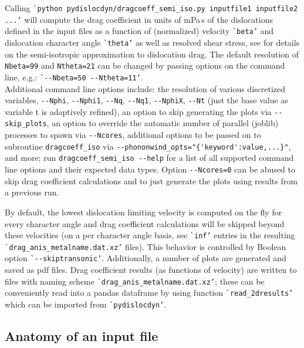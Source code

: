 \documentclass[11pt,letterpaper,oneside,pdftex]{article}
\begin{document}
Calling \verb|`python pydislocdyn/dragcoeff_semi_iso.py inputfile1 inputfile2 ...’| will compute the drag coefficient in units of mPa\,s of the dislocations defined in the input files as a function of (normalized) velocity \verb|`beta’| and dislocation character angle \verb|`theta’| as well as resolved shear stress, see \cite{Blaschke:2018anis,Blaschke:2019fits,Blaschke:2021impact} for details on the semi-isotropic approximation to dislocation drag.
The default resolution of \verb|Nbeta=99| and \verb|Ntheta=21| can be changed by passing options on the command line, e.g.:
\verb|`--Nbeta=50 --Ntheta=11’|.\\
Additional command line options include:
the resolution of various discretized variables, \verb|--Nphi|, \verb|--Nphi1|, \verb|--Nq|, \verb|--Nq1|, \verb|--NphiX|, \verb|--Nt| (just the base value as variable t is adaptively refined),
an option to skip generating the plots via \verb|--skip_plots|,
an option to override the automatic number of parallel (joblib) processes to spawn via \verb|--Ncores|,
additional options to be passed on to subroutine \verb|dragcoeff_iso| via \verb|--phononwind_opts="{'keyword':value,...}"|,
and more; run \verb|dragcoeff_semi_iso --help| for a list of all supported command line options and their expected data types.
Option \verb|--Ncores=0| can be abused to skip drag coefficient calculations and to just generate the plots using results from a previous run.

By default, the lowest dislocation limiting velocity is computed on the fly for every character angle and drag coefficient calculations will be skipped beyond these velocities (on a per character angle basis, see \verb|`inf’| entries in the resulting \verb|`drag_anis_metalname.dat.xz’| files).
This behavior is controlled by Boolean option \verb|`--skiptransonic’|.
Additionally, a number of plots are generated and saved as pdf files.
Drag coefficient results (as functions of velocity) are written to files with naming scheme \verb|`drag_anis_metalname.dat.xz’|;
these can be conveniently read into a pandas dataframe by using function \verb|`read_2dresults’| which can be imported from \verb|`pydislocdyn’|.




\subsection{Anatomy of an input file}
\label{sec:inputfiles}
\end{document}

